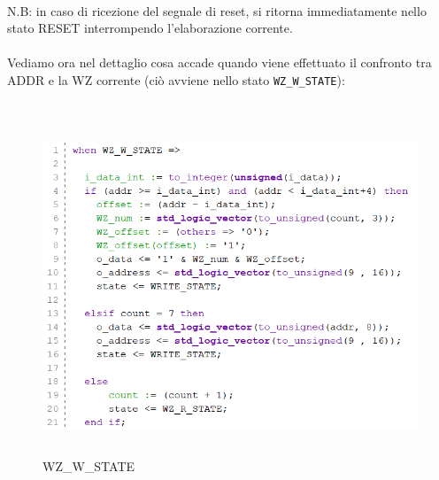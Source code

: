 \documentclass{article}
\begin{document}
\noindent\\
N.B: in caso di ricezione del segnale di reset, si ritorna immediatamente nello stato RESET interrompendo l'elaborazione corrente.\\\\
Vediamo ora nel dettaglio cosa accade quando viene effettuato il confronto tra ADDR e la WZ corrente (ciò avviene nello stato \verb^WZ_W_STATE^):\\\\
\begin{figure}[H]
    \centering
    \includegraphics[height=10cm]{images/wz-w-state.png}
    \caption{WZ\_W\_STATE}
    \label{fig:wz-w-state}
\end{figure}
\newpage
\end{document}
